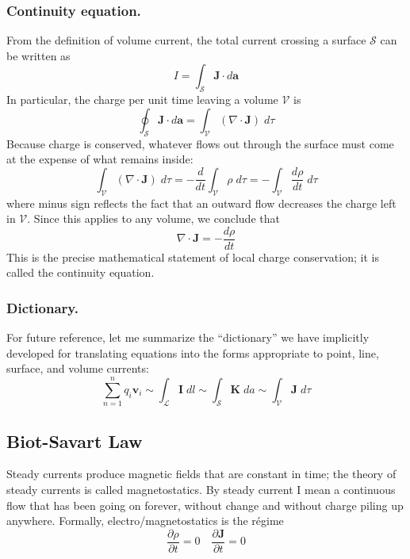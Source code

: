 \documentclass[../../../main.tex]{subfiles}
\begin{document}
\subsubsection{Continuity equation.} From the definition of volume current, the total current crossing a surface $\mathcal{S}$ can be written as
\begin{equation*}
    I=\int_{\mathcal{S}}\mathbf{J}\cdot d\mathbf{a}
\end{equation*}
In particular, the charge per unit time leaving a volume $\mathcal{V}$ is
\begin{equation*}
    \oint_{\mathcal{S}} \mathbf{J}\cdot d\mathbf{a}=\int_{\mathcal{V}}(\nabla\cdot\mathbf{J}) \;d\tau
\end{equation*}
Because charge is conserved, whatever ﬂows out through the surface must come at the expense of what remains inside:
\begin{equation*}
    \int_{\mathcal{V}}(\nabla\cdot\mathbf{J}) \;d\tau=-\frac{d}{dt}\int_\mathcal{V}\rho\;d\tau= -\int_\mathcal{V}\frac{d\rho}{dt}\;d\tau
\end{equation*}
where minus sign reﬂects the fact that an outward ﬂow decreases the charge left in $\mathcal{V}$. Since this applies to any volume, we conclude that
\begin{equation*}
    \nabla\cdot\mathbf{J}=-\frac{d\rho}{dt}
\end{equation*}
This is the precise mathematical statement of local charge conservation; it is called the continuity equation.

\subsubsection{Dictionary.} For future reference, let me summarize the “dictionary” we have implicitly developed for translating equations into the forms appropriate to point, line, surface, and volume currents:
\begin{equation*}
    \sum_{n=1}^{n}q_i\mathbf{v}_i\sim\int_\mathcal{L}\mathbf{I}\;dl \sim \int_\mathcal{S}\mathbf{K}\;da \sim \int_\mathcal{V}\mathbf{J}\;d\tau
\end{equation*}

\subsection{Biot-Savart Law}
Steady currents produce magnetic ﬁelds that are constant in time; the theory of steady currents is called magnetostatics. By steady current I mean a continuous ﬂow that has been going on forever, without change and without charge piling up anywhere. Formally, electro/magnetostatics is the régime
\begin{equation*}
    \frac{\partial\rho}{\partial t}=0 \quad\frac{\partial \mathbf{J}}{\partial t}=0
\end{equation*}
\end{document}
